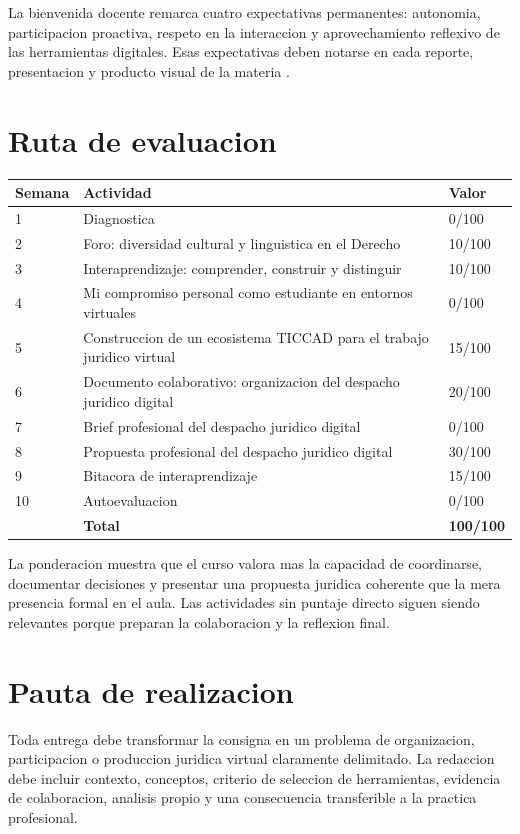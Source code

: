 \documentclass[
  spanish,
  letterpaper, oneside
]{article}
\begin{document}
La bienvenida docente remarca cuatro expectativas permanentes: autonomia,
participacion proactiva, respeto en la interaccion y aprovechamiento reflexivo de
las herramientas digitales. Esas expectativas deben notarse en cada reporte,
presentacion y producto visual de la materia \citep{santanaBienvenidaInteraprendizaje2026}.

\section{Ruta de evaluacion}

\begin{longtable}{p{1.2cm}p{9.0cm}p{2.0cm}}
\textbf{Semana} & \textbf{Actividad} & \textbf{Valor} \\
\hline
1 & Diagnostica & 0/100 \\
2 & Foro: diversidad cultural y linguistica en el Derecho & 10/100 \\
3 & Interaprendizaje: comprender, construir y distinguir & 10/100 \\
4 & Mi compromiso personal como estudiante en entornos virtuales & 0/100 \\
5 & Construccion de un ecosistema TICCAD para el trabajo juridico virtual & 15/100 \\
6 & Documento colaborativo: organizacion del despacho juridico digital & 20/100 \\
7 & Brief profesional del despacho juridico digital & 0/100 \\
8 & Propuesta profesional del despacho juridico digital & 30/100 \\
9 & Bitacora de interaprendizaje & 15/100 \\
10 & Autoevaluacion & 0/100 \\
\hline
 & \textbf{Total} & \textbf{100/100} \\
\end{longtable}

La ponderacion muestra que el curso valora mas la capacidad de coordinarse,
documentar decisiones y presentar una propuesta juridica coherente que la mera
presencia formal en el aula. Las actividades sin puntaje directo siguen siendo
relevantes porque preparan la colaboracion y la reflexion final.

\section{Pauta de realizacion}

Toda entrega debe transformar la consigna en un problema de organizacion,
participacion o produccion juridica virtual claramente delimitado. La redaccion
debe incluir contexto, conceptos, criterio de seleccion de herramientas,
evidencia de colaboracion, analisis propio y una consecuencia transferible a la
practica profesional.
\end{document}
